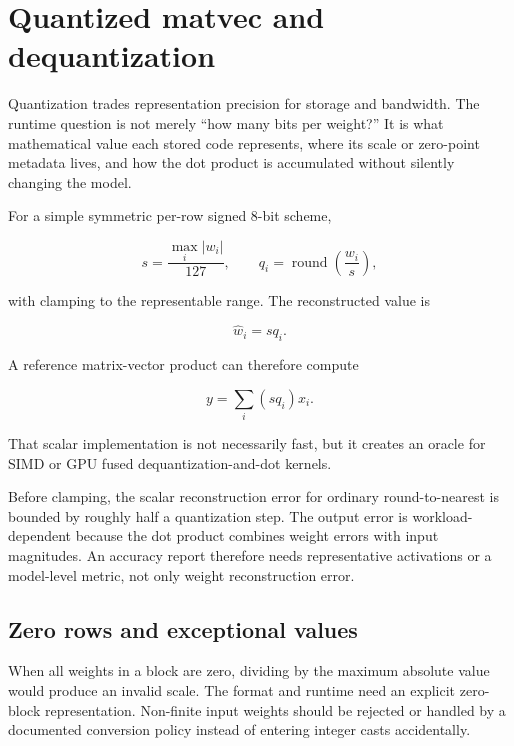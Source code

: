 \hypertarget{appendix-241c0e42ac2d}{}\label{referencestart:appendix-241c0e42ac2d}
\section{Quantized matvec and dequantization}\label{appendix-241c0e42ac2d-quantized-matvec-and-dequantization}

\hypertarget{appendix-241c0e42ac2d-quantized-matvec-and-dequantization}{}

Quantization trades representation precision for storage and bandwidth. The runtime question is not merely ``how many bits per weight?'' It is what mathematical value each stored code represents, where its scale or zero-point metadata lives, and how the dot product is accumulated without silently changing the model.

For a simple symmetric per-row signed 8-bit scheme,

\[
s = \frac{\max_i |w_i|}{127},
\qquad
q_i = \operatorname{round}\!\left(\frac{w_i}{s}\right),
\]

with clamping to the representable range. The reconstructed value is

\[
\hat w_i = s q_i.
\]

A reference matrix-vector product can therefore compute

\[
y = \sum_i (s q_i)x_i.
\]

That scalar implementation is not necessarily fast, but it creates an oracle for SIMD or GPU fused dequantization-and-dot kernels.

Before clamping, the scalar reconstruction error for ordinary round-to-nearest is bounded by roughly half a quantization step. The output error is workload-dependent because the dot product combines weight errors with input magnitudes. An accuracy report therefore needs representative activations or a model-level metric, not only weight reconstruction error.

\subsection{Zero rows and exceptional values}\label{appendix-241c0e42ac2d-zero-rows-and-exceptional-values}

\hypertarget{appendix-241c0e42ac2d-zero-rows-and-exceptional-values}{}

When all weights in a block are zero, dividing by the maximum absolute value would produce an invalid scale. The format and runtime need an explicit zero-block representation. Non-finite input weights should be rejected or handled by a documented conversion policy instead of entering integer casts accidentally.

